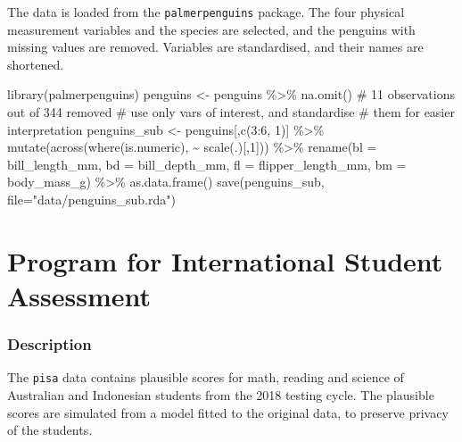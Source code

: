 \documentclass[
  letterpaper,
]{krantz}
\newenvironment{Shaded}{\begin{snugshade}}{\end{snugshade}}
\newcommand{\AttributeTok}[1]{\textcolor[rgb]{0.40,0.45,0.13}{#1}}
\newcommand{\CommentTok}[1]{\textcolor[rgb]{0.37,0.37,0.37}{#1}}
\newcommand{\DecValTok}[1]{\textcolor[rgb]{0.68,0.00,0.00}{#1}}
\newcommand{\FunctionTok}[1]{\textcolor[rgb]{0.28,0.35,0.67}{#1}}
\newcommand{\NormalTok}[1]{\textcolor[rgb]{0.00,0.23,0.31}{#1}}
\newcommand{\OtherTok}[1]{\textcolor[rgb]{0.00,0.23,0.31}{#1}}
\newcommand{\SpecialCharTok}[1]{\textcolor[rgb]{0.37,0.37,0.37}{#1}}
\newcommand{\StringTok}[1]{\textcolor[rgb]{0.13,0.47,0.30}{#1}}
\begin{document}
The data is loaded from the \texttt{palmerpenguins} package. The four
physical measurement variables and the species are selected, and the
penguins with missing values are removed. Variables are standardised,
and their names are shortened.

\begin{Shaded}
\begin{Highlighting}[]
\FunctionTok{library}\NormalTok{(palmerpenguins)}
\NormalTok{penguins }\OtherTok{\textless{}{-}}\NormalTok{ penguins }\SpecialCharTok{\%\textgreater{}\%}
  \FunctionTok{na.omit}\NormalTok{() }\CommentTok{\# 11 observations out of 344 removed}
\CommentTok{\# use only vars of interest, and standardise}
\CommentTok{\# them for easier interpretation}
\NormalTok{penguins\_sub }\OtherTok{\textless{}{-}}\NormalTok{ penguins[,}\FunctionTok{c}\NormalTok{(}\DecValTok{3}\SpecialCharTok{:}\DecValTok{6}\NormalTok{, }\DecValTok{1}\NormalTok{)] }\SpecialCharTok{\%\textgreater{}\%} 
  \FunctionTok{mutate}\NormalTok{(}\FunctionTok{across}\NormalTok{(}\FunctionTok{where}\NormalTok{(is.numeric),  }\SpecialCharTok{\textasciitilde{}} \FunctionTok{scale}\NormalTok{(.)[,}\DecValTok{1}\NormalTok{])) }\SpecialCharTok{\%\textgreater{}\%}
  \FunctionTok{rename}\NormalTok{(}\AttributeTok{bl =}\NormalTok{ bill\_length\_mm,}
         \AttributeTok{bd =}\NormalTok{ bill\_depth\_mm,}
         \AttributeTok{fl =}\NormalTok{ flipper\_length\_mm,}
         \AttributeTok{bm =}\NormalTok{ body\_mass\_g) }\SpecialCharTok{\%\textgreater{}\%}
  \FunctionTok{as.data.frame}\NormalTok{()}
\FunctionTok{save}\NormalTok{(penguins\_sub, }\AttributeTok{file=}\StringTok{"data/penguins\_sub.rda"}\NormalTok{)}
\end{Highlighting}
\end{Shaded}

\section{Program for International Student
Assessment}\label{program-for-international-student-assessment}

\subsubsection*{Description}\label{description-4}

The \texttt{pisa} data contains plausible scores for math, reading and
science of Australian and Indonesian students from the 2018 testing
cycle. The plausible scores are simulated from a model fitted to the
original data, to preserve privacy of the students.
\end{document}
